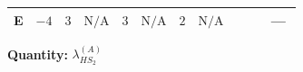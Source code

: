 \documentclass[8pt]{article}
\begin{document}
\begin{landscape}
\begin{longtable}{@{}llcccccc >{\raggedright\arraybackslash}p{0.21\linewidth} >{\raggedright\arraybackslash}p{0.21\linewidth} >{\raggedright\arraybackslash}p{0.21\linewidth}@{}}
\midrule
E & $-4$ & $3$ & $\text{N/A}$ & $3$ & $\text{N/A}$ & $2$ & $\text{N/A}$ & \scriptsize\adjustbox{max width=\linewidth}{$\begin{gathered} {\lambda_{HS_2}^{(A)}} (6 \operatorname{Tr}\!\left({Y_d}\,\left({Y_d}\right)^{\dagger}\right)+2 \operatorname{Tr}\!\left({Y_e}\,\left({Y_e}\right)^{\dagger}\right)+6 \operatorname{Tr}\!\left({Y_u}\,\left({Y_u}\right)^{\dagger}\right)+16 {\lambda_{S_2}^{(A)}})\end{gathered}$} & \scriptsize\adjustbox{max width=\linewidth}{$\begin{gathered} -\frac{8}{9} {\lambda_5} \left({\lambda_5}\right)^{*}\end{gathered}$} & --- \\
\midrule
\bottomrule
\end{longtable}
\clearpage
\noindent\textbf{Quantity: }$\lambda_{HS_2}^{(A)}$\par\smallskip

\end{landscape}
\end{document}
